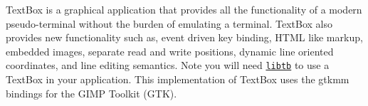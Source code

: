 Text\+Box is a graphical application that provides all the functionality of a modern pseudo-\/terminal without the burden of emulating a terminal. Text\+Box also provides new functionality such as, event driven key binding, H\+T\+ML like markup, embedded images, separate read and write positions, dynamic line oriented coordinates, and line editing semantics. Note you will need \href{https://codrod.github.io/libtb/index.html}{\tt libtb} to use a Text\+Box in your application. This implementation of Text\+Box uses the gtkmm bindings for the G\+I\+MP Toolkit (G\+TK). 